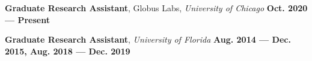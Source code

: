 \documentclass[11pt,letterpaper,roman,colorlinks,linkcolor=blue]{moderncv}
\begin{document}
\textbf{Graduate Research Assistant}, Globus Labs, \emph{University of Chicago}
\hfill \textbf{Oct. 2020 --- Present}

\textbf{Graduate Research Assistant}, \emph{University of Florida}
\hfill \textbf{Aug. 2014 --- Dec. 2015, Aug. 2018 --- Dec. 2019}
\end{document}
